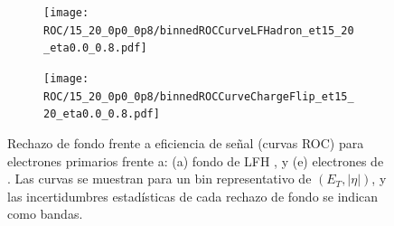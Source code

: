 \begin{figure}[h]
  \centering
  \begin{subfigure}[t]{0.5\linewidth}
    \centering
    \texttt{[image: ROC/15\_20\_0p0\_0p8/binnedROCCurveLFHadron\_et15\_20\_eta0.0\_0.8.pdf]}
    \caption{}
    \label{fig:roc_pc}
  \end{subfigure}\hfill
  \begin{subfigure}[t]{0.5\linewidth}
    \centering
    \texttt{[image: ROC/15\_20\_0p0\_0p8/binnedROCCurveChargeFlip\_et15\_20\_eta0.0\_0.8.pdf]}
    \caption{}
    \label{fig:roc_hf}
  \end{subfigure}

  \caption{Rechazo de fondo frente a eficiencia de señal (curvas ROC) para electrones primarios frente a:
  (a) fondo de LFH  ,
  y (e) electrones de .
  Las curvas se muestran para un bin representativo de $(E_{T}, |\eta|)$, y las incertidumbres estadísticas de cada rechazo de fondo se indican como bandas.}
  \label{fig:roc_mainbkg}
\end{figure}

